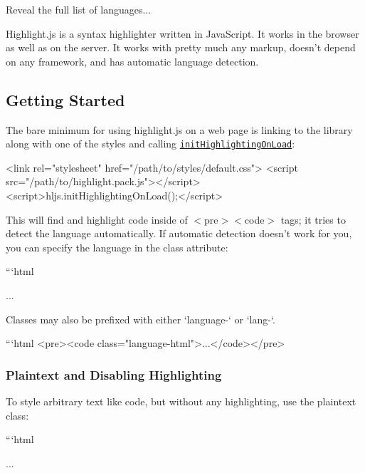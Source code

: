 Reveal the full list of languages...

\href{https://travis-ci.org/highlightjs/highlight.js}{\tt } \href{https://greenkeeper.io/}{\tt }

Highlight.\+js is a syntax highlighter written in Java\+Script. It works in the browser as well as on the server. It works with pretty much any markup, doesn’t depend on any framework, and has automatic language detection.

\subsection*{Getting Started}

The bare minimum for using highlight.\+js on a web page is linking to the library along with one of the styles and calling \href{http://highlightjs.readthedocs.io/en/latest/api.html#inithighlightingonload}{\tt {\ttfamily init\+Highlighting\+On\+Load}}\+:


\begin{DoxyCode}
<link rel="stylesheet" href="/path/to/styles/default.css">
<script src="/path/to/highlight.pack.js"></script>
<script>hljs.initHighlightingOnLoad();</script>
\end{DoxyCode}


This will find and highlight code inside of {\ttfamily $<$pre$>$$<$code$>$} tags; it tries to detect the language automatically. If automatic detection doesn’t work for you, you can specify the language in the {\ttfamily class} attribute\+:

```html 
\begin{DoxyPre}
\begin{DoxyCode}
...
\end{DoxyCode}
\end{DoxyPre}
 
\begin{DoxyCode}
Classes may also be prefixed with either `language-` or `lang-`.

```html
<pre><code class="language-html">...</code></pre>
\end{DoxyCode}


\subsubsection*{Plaintext and Disabling Highlighting}

To style arbitrary text like code, but without any highlighting, use the {\ttfamily plaintext} class\+:

```html 
\begin{DoxyPre}
\begin{DoxyCode}
...
\end{DoxyCode}
\end{DoxyPre}
 
